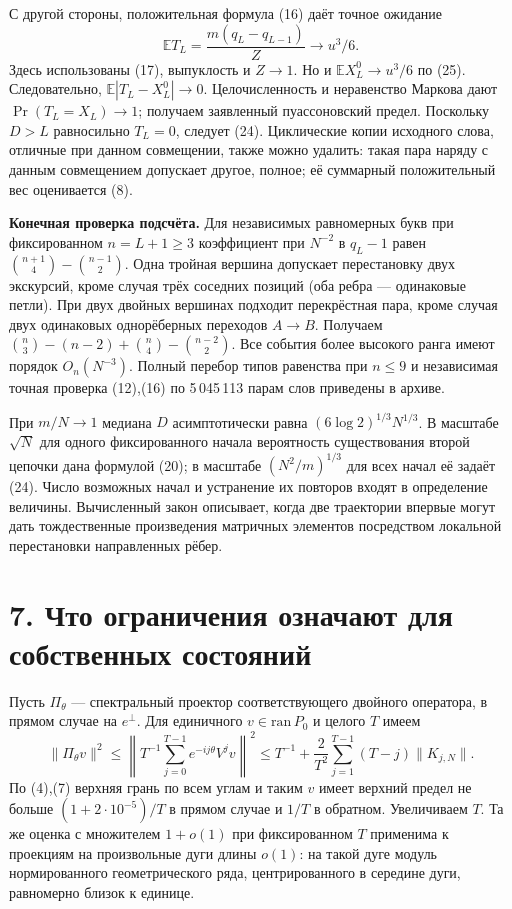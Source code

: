 \documentclass[11pt,a4paper]{article}
\newcommand{\sect}[1]{\section*{\sffamily\color{ink}#1}}
\newcommand{\subt}[1]{\par\medskip\noindent\textbf{#1.}\quad}
\begin{document}
С другой стороны, положительная формула (16) даёт точное ожидание
\[
                  \mathbb E T_L=\frac{m(q_L-q_{L-1})}{Z}\to u^3/6.
\]
Здесь использованы (17), выпуклость и $Z\to1$. Но и $\mathbb E X_L^0\to u^3/6$ по (25). Следовательно, $\mathbb E|T_L-X_L^0|\to0$. Целочисленность и неравенство Маркова дают $\Pr(T_L=X_L)\to1$; получаем заявленный пуассоновский предел. Поскольку $D>L$ равносильно $T_L=0$, следует (24). Циклические копии исходного слова, отличные при данном совмещении, также можно удалить: такая пара наряду с данным совмещением допускает другое, полное; её суммарный положительный вес оценивается (8).

\subt{Конечная проверка подсчёта} Для независимых равномерных букв при фиксированном $n=L+1\ge3$ коэффициент при $N^{-2}$ в $q_L-1$ равен $\binom{n+1}{4}-\binom{n-1}{2}$. Одна тройная вершина допускает перестановку двух экскурсий, кроме случая трёх соседних позиций (оба ребра --- одинаковые петли). При двух двойных вершинах подходит перекрёстная пара, кроме случая двух одинаковых однорёберных переходов $A\to B$. Получаем $\binom n3-(n-2)+\binom n4-\binom{n-2}2$. Все события более высокого ранга имеют порядок $O_n(N^{-3})$. Полный перебор типов равенства при $n\le9$ и независимая точная проверка (12),(16) по 5\,045\,113 парам слов приведены в архиве.

При $m/N\to1$ медиана $D$ асимптотически равна $(6\log 2)^{1/3}N^{1/3}$. В масштабе $\sqrt N$ для одного фиксированного начала вероятность существования второй цепочки дана формулой (20); в масштабе $(N^2/m)^{1/3}$ для всех начал её задаёт (24). Число возможных начал и устранение их повторов входят в определение величины. Вычисленный закон описывает, когда две траектории впервые могут дать тождественные произведения матричных элементов посредством локальной перестановки направленных рёбер.
\newpage
\sect{7. Что ограничения означают для собственных состояний}
Пусть $\Pi_\theta$ --- спектральный проектор соответствующего двойного оператора, в прямом случае на $e^\perp$. Для единичного $v\in\mathrm{ran}\,P_0$ и целого $T$ имеем
\[
 \|\Pi_\theta v\|^2\le\left\|T^{-1}\sum_{j=0}^{T-1} e^{-ij\theta}V^jv\right\|^2
 \le T^{-1}+\frac2{T^2}\sum_{j=1}^{T-1}(T-j)\|K_{j,N}\|.
\]
По (4),(7) верхняя грань по всем углам и таким $v$ имеет верхний предел не больше $(1+2\cdot10^{-5})/T$ в прямом случае и $1/T$ в обратном. Увеличиваем $T$. Та же оценка с множителем $1+o(1)$ при фиксированном $T$ применима к проекциям на произвольные дуги длины $o(1)$: на такой дуге модуль нормированного геометрического ряда, центрированного в середине дуги, равномерно близок к единице.
\end{document}
